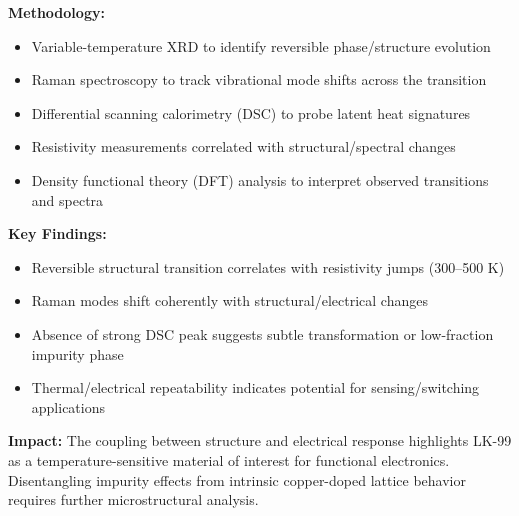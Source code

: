 \textbf{Methodology:}
\begin{itemize}[leftmargin=1.2em, itemsep=0.1em]
  \item Variable-temperature XRD to identify reversible phase/structure evolution
  \item Raman spectroscopy to track vibrational mode shifts across the transition
  \item Differential scanning calorimetry (DSC) to probe latent heat signatures
  \item Resistivity measurements correlated with structural/spectral changes
  \item Density functional theory (DFT) analysis to interpret observed transitions and spectra
\end{itemize}

\textbf{Key Findings:}
\begin{itemize}[leftmargin=1.2em, itemsep=0.1em]
  \item Reversible structural transition correlates with resistivity jumps (300--500 K)
  \item Raman modes shift coherently with structural/electrical changes
  \item Absence of strong DSC peak suggests subtle transformation or low-fraction impurity phase
  \item Thermal/electrical repeatability indicates potential for sensing/switching applications
\end{itemize}

\textbf{Impact:} 
The coupling between structure and electrical response highlights LK-99 as a temperature-sensitive material of interest for functional electronics. Disentangling impurity effects from intrinsic copper-doped lattice behavior requires further microstructural analysis.